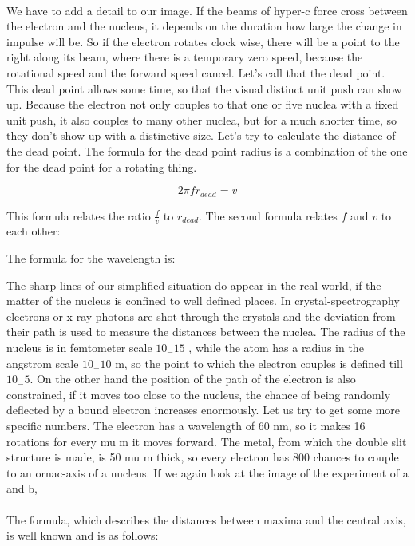 \paragraph{}
We have to add a detail to our image. If the beams of hyper-c force cross between the electron and the nucleus, it depends on the duration how large the change in impulse will be. So if the electron rotates clock wise, there will be a point to the right along its beam, where there is a temporary zero speed, because the rotational speed and the forward speed cancel. Let's call that the dead point. This dead point allows some time, so that the visual distinct unit push can show up. Because the electron not only couples to that one or five nuclea with a fixed unit push, it also couples to many other nuclea, but for a much shorter time, so they don't show up with a distinctive size. Let's try to calculate the distance of the dead point.
The formula for the dead point radius is a combination of the one for the dead point for a rotating thing.

\[2\pi f r_{dead} = v\]

This formula relates the ratio $\frac{f}{v}$ to $r_{dead}$. The second formula relates $f$ and $v$  to each other:

The formula for the wavelength is:

The sharp lines of our simplified situation do appear in the real world, if the matter of the nucleus is confined to well defined places. In crystal-spectrography electrons or x-ray photons are shot through the crystals and the deviation from their path is used to measure the distances between the nuclea. The radius of the nucleus is in femtometer scale $10_-15$ , while the atom has a radius in the angstrom scale $10_-10$ m, so the point to which the electron couples is defined till $10_-5$. On the other hand the position of the path of the electron is also constrained, if it moves too close to the nucleus, the chance of being randomly deflected by a bound electron increases enormously.
Let us try to get some more specific numbers. The electron has a wavelength of 60 nm, so it makes 16 rotations for every mu m it moves forward. The metal, from which the double slit structure is made, is 50 mu m thick, so every electron has 800 chances to couple to an ornac-axis of a nucleus. If we again look at the image of the experiment of a and b,

\paragraph{}
The formula, which describes the distances between maxima and the central axis, is well known and is as follows:

